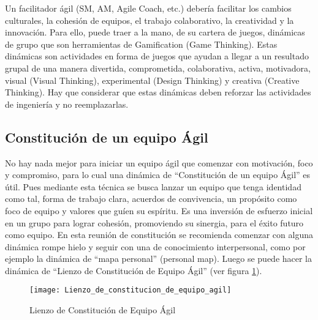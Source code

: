 Un facilitador ágil (SM, AM, Agile Coach, etc.) debería facilitar los cambios culturales, la cohesión de equipos, el trabajo colaborativo, la creatividad y la innovación. Para ello, puede traer a la mano, de su cartera de juegos, dinámicas de grupo que son herramientas de Gamification (Game Thinking). Estas dinámicas son actividades en forma de juegos que ayudan a llegar a un resultado grupal de una manera divertida, comprometida, colaborativa, activa, motivadora, visual (Visual Thinking), experimental (Design Thinking) y creativa (Creative Thinking). Hay que considerar que estas dinámicas deben reforzar las actividades de ingeniería y no reemplazarlas.

\subsection{Constitución de un equipo Ágil}

No hay nada mejor para iniciar un equipo ágil que comenzar con motivación, foco y compromiso, para lo cual una dinámica de  “Constitución de un equipo Ágil” es útil. Pues mediante esta técnica se busca lanzar un equipo que tenga identidad como tal, forma de trabajo clara, acuerdos de convivencia, un propósito como foco de equipo y valores que guíen su espíritu. Es una inversión de esfuerzo inicial en un grupo para lograr cohesión, promoviendo su sinergia, para el éxito futuro como equipo. En esta reunión de constitución se recomienda comenzar con alguna dinámica rompe hielo y seguir con una de conocimiento interpersonal, como por ejemplo la dinámica de “mapa personal” (personal map). Luego se puede hacer la dinámica de “Lienzo de Constitución de Equipo Ágil” (ver figura \ref{fig:Lienzo_de_constitucion_de_equipo_agil}). 

\begin{figure}[h]
  \centering
  \texttt{[image: Lienzo\_de\_constitucion\_de\_equipo\_agil]}
  \caption{Lienzo de Constitución de Equipo Ágil}
  \centering
  \label{fig:Lienzo_de_constitucion_de_equipo_agil} %
\end{figure}

